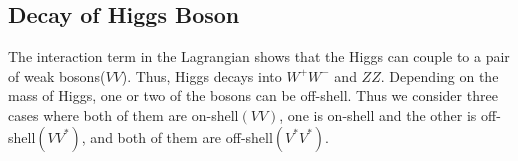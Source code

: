 
\subsection{Decay of Higgs Boson}
The interaction term in the Lagrangian shows that the Higgs can 
couple to a pair of weak bosons($VV$). Thus, Higgs decays into $W^+W^-$ and $ZZ$.
Depending on the mass of Higgs, one or two of the bosons can be off-shell. 
Thus we consider three cases where both of them are on-shell$(VV)$, 
one is on-shell and the other is off-shell$(VV^*)$, 
and both of them are off-shell$(V^*V^*)$. 
